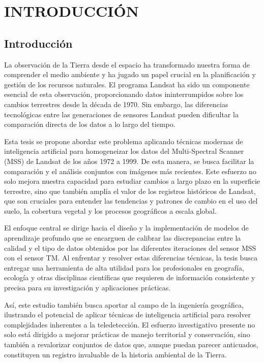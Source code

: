 \Chapter{}

\chapter{INTRODUCCIÓN}
    \section{Introducción}
        La observación de la Tierra desde el espacio ha transformado nuestra forma de comprender el medio ambiente y ha jugado un papel crucial en la planificación y gestión de los recursos naturales. El programa Landsat ha sido un componente esencial de esta observación, proporcionando datos ininterrumpidos sobre los cambios terrestres desde la década de 1970. Sin embargo, las diferencias tecnológicas entre las generaciones de sensores Landsat pueden dificultar la comparación directa de los datos a lo largo del tiempo.

        Esta tesis se propone abordar este problema aplicando técnicas modernas de inteligencia artificial para homogeneizar los datos del Multi-Spectral Scanner (MSS) de Landsat de los años 1972 a 1999. De esta manera, se busca facilitar la comparación y el análisis conjuntos con imágenes más recientes. Este esfuerzo no solo mejora nuestra capacidad para estudiar cambios a largo plazo en la superficie terrestre, sino que también amplía el valor de los registros históricos de Landsat, que son cruciales para entender las tendencias y patrones de cambio en el uso del suelo, la cobertura vegetal y los procesos geográficos a escala global.

        El enfoque central se dirige hacia el diseño y la implementación de modelos de aprendizaje profundo que se encarguen de calibrar las discrepancias entre la calidad y el tipo de datos obtenidos por las diferentes iteraciones del sensor MSS con el sensor TM. Al enfrentar y resolver estas diferencias técnicas, la tesis busca entregar una herramienta de alta utilidad para los profesionales en geografía, ecología y otras disciplinas científicas que requieren de información consistente y precisa para su investigación y aplicaciones prácticas.

        Así, este estudio también busca aportar al campo de la ingeniería geográfica, ilustrando el potencial de aplicar técnicas de inteligencia artificial para resolver complejidades inherentes a la teledetección. El esfuerzo investigativo presente no solo está dirigido a mejorar prácticas de manejo territorial y conservación, sino también a revalorizar conjuntos de datos que, aunque puedan parecer anticuados, constituyen un registro invaluable de la historia ambiental de la Tierra.
